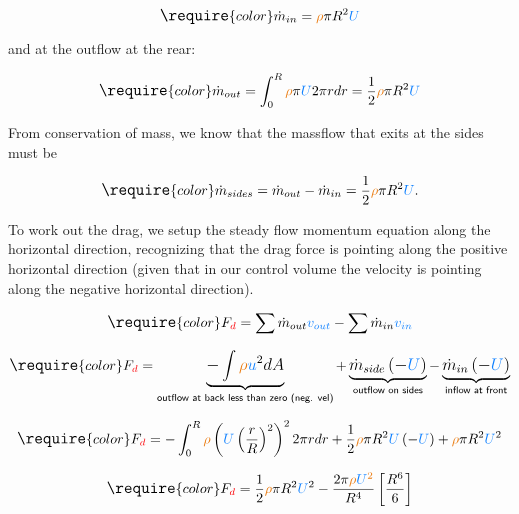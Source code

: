 \documentclass[
  1.2em,
  letterpaper,
  DIV=11,
  numbers=noendperiod]{scrartcl}
\begin{document}
\[
\large
\require{color}\dot{m}_{in} = {\color[rgb]{0.918231,0.469102,0.038229}\rho } \pi R^2 {\color[rgb]{0.059472,0.501943,0.998465}U }
\]

and at the outflow at the rear:

\[
\large
\require{color}\dot{m}_{out} = \int_{0}^{R} {\color[rgb]{0.918231,0.469102,0.038229}\rho } \pi {\color[rgb]{0.059472,0.501943,0.998465}U } 2 \pi r dr = \frac{1}{2} {\color[rgb]{0.918231,0.469102,0.038229}\rho } \pi R^2 {\color[rgb]{0.059472,0.501943,0.998465}U }
\]

From conservation of mass, we know that the massflow that exits at the
sides must be

\[
\large
\require{color}\dot{m}_{sides} = \dot{m}_{out} - \dot{m}_{in} = \frac{1}{2} {\color[rgb]{0.918231,0.469102,0.038229}\rho } \pi R^2 {\color[rgb]{0.059472,0.501943,0.998465}U }.
\]

To work out the drag, we setup the steady flow momentum equation along
the horizontal direction, recognizing that the drag force is pointing
along the positive horizontal direction (given that in our control
volume the velocity is pointing along the negative horizontal
direction).

\[
\large
\require{color}F_{{\color[rgb]{0.986252,0.007236,0.027423}d}} = \sum \dot{m}_{out} {\color[rgb]{0.059472,0.501943,0.998465}v_{out}} - \sum \dot{m}_{in} {\color[rgb]{0.059472,0.501943,0.998465}v_{in}}
\]

\[
\large
\require{color}F_{{\color[rgb]{0.986252,0.007236,0.027423}d}} = \underbrace{-\int {\color[rgb]{0.918231,0.469102,0.038229}\rho} {\color[rgb]{0.059472,0.501943,0.998465}u}^2 dA }_{\textsf{outflow at back less than zero (neg. vel)}} + \underbrace{\dot{m}_{side}\left(-{\color[rgb]{0.059472,0.501943,0.998465}U} \right)}_{\textsf{outflow on sides}}  - \underbrace{\dot{m}_{in} \left(-{\color[rgb]{0.059472,0.501943,0.998465}U} \right)}_{\textsf{inflow at front}}
\]

\[
\large
\require{color}F_{{\color[rgb]{0.986252,0.007236,0.027423}d}} = -\int_{0}^{R} {\color[rgb]{0.918231,0.469102,0.038229}\rho } \left( {\color[rgb]{0.059472,0.501943,0.998465}U } \left( \frac{r}{R} \right)^2  \right)^2 2 \pi r dr + \frac{1}{2} {\color[rgb]{0.918231,0.469102,0.038229}\rho } \pi R^2 {\color[rgb]{0.059472,0.501943,0.998465}U} \left(-{\color[rgb]{0.059472,0.501943,0.998465}U}\right) + {\color[rgb]{0.918231,0.469102,0.038229}\rho } \pi R^2 {\color[rgb]{0.059472,0.501943,0.998465}U}^2 
\]

\[
\large
\require{color}F_{{\color[rgb]{0.986252,0.007236,0.027423}d}} = \frac{1}{2} {\color[rgb]{0.918231,0.469102,0.038229}\rho } \pi R^2 {\color[rgb]{0.059472,0.501943,0.998465}U}^2 - \frac{2 \pi {\color[rgb]{0.918231,0.469102,0.038229}\rho  {\color[rgb]{0.059472,0.501943,0.998465}U}^2} }{R^4} \left[ \frac{R^6}{6} \right]
\]
\end{document}
